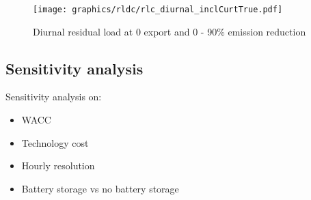\begin{figure}[h!]
    \centering
    \texttt{[image: graphics/rldc/rlc\_diurnal\_inclCurtTrue.pdf]}
    \caption{Diurnal residual load at 0 export and 0 - 90\% emission reduction}
    \label{fig:diurnal}
\end{figure}

\subsection{Sensitivity analysis}
\label{subsec:sensitivity}
Sensitivity analysis on:
\begin{itemize}
    \item WACC
    \item Technology cost
    \item Hourly resolution
    \item Battery storage vs no battery storage
\end{itemize}


